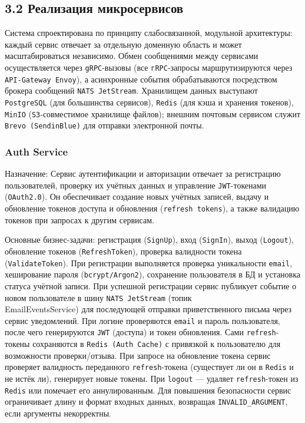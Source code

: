 \subsection*{3.2 Реализация микросервисов}

Система спроектирована по принципу слабосвязанной, модульной архитектуры: каждый сервис отвечает за отдельную доменную область и может масштабироваться независимо. Обмен сообщениями между сервисами осуществляется через \texttt{gRPC}-вызовы (все \texttt{гRPC}-запросы маршрутизируются через \texttt{API-Gateway Envoy}), а асинхронные события обрабатываются посредством брокера сообщений \texttt{NATS JetStream}. Хранилищем данных выступают \texttt{PostgreSQL} (для большинства сервисов), \texttt{Redis} (для кэша и хранения токенов), \texttt{MinIO} (\texttt{S3}-совместимое хранилище файлов); внешним почтовым сервисом служит \texttt{Brevo (SendinBlue)} для отправки электронной почты.

\subsubsection*{Auth Service}
Назначение: Сервис аутентификации и авторизации отвечает за регистрацию пользователей, проверку их учётных данных и управление \texttt{JWT}-токенами (\texttt{OAuth2.0}). Он обеспечивает создание новых учётных записей, выдачу и обновление токенов доступа и обновления (\texttt{refresh tokens}), а также валидацию токенов при запросах к другим сервисам.

Основные бизнес-задачи: регистрация (\texttt{SignUp}), вход (\texttt{SignIn}), выход (\texttt{Logout}), обновление токенов (\texttt{RefreshToken}), проверка валидности токена (\texttt{ValidateToken}). При регистрации выполняется проверка уникальности \texttt{email}, хеширование пароля (\texttt{bcrypt/Argon2}), сохранение пользователя в БД и установка статуса учётной записи. При успешной регистрации сервис публикует событие о новом пользователе в шину \texttt{NATS JetStream} (топик \\ EmailEventsService) для последующей отправки приветственного письма через сервис уведомлений. При логине проверяются \texttt{email} и пароль пользователя, после чего генерируются \texttt{JWT} (доступа) и токен обновления. Сами \texttt{refresh}-токены сохраняются в \texttt{Redis (Auth Cache)} с привязкой к пользователю для возможности проверки/отзыва. При запросе на обновление токена сервис проверяет валидность переданного \texttt{refresh}-токена (существует ли он в \texttt{Redis} и не истёк ли), генерирует новые токены. При \texttt{logout} — удаляет \texttt{refresh}-токен из \texttt{Redis} или помечает его аннулированным. Для повышения безопасности сервис ограничивает длину и формат входных данных, возвращая \texttt{INVALID\_ARGUMENT}, если аргументы некорректны.

